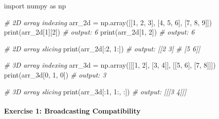 \documentclass[11pt]{article}
\newenvironment{Shaded}{}{}
\newcommand{\DecValTok}[1]{\textcolor[rgb]{0.25,0.63,0.44}{{#1}}}
\newcommand{\CommentTok}[1]{\textcolor[rgb]{0.38,0.63,0.69}{\textit{{#1}}}}
\newcommand{\NormalTok}[1]{{#1}}
\newcommand{\ImportTok}[1]{{#1}}
\newcommand{\OperatorTok}[1]{\textcolor[rgb]{0.40,0.40,0.40}{{#1}}}
\newcommand{\BuiltInTok}[1]{{#1}}
\begin{document}
\begin{Shaded}
\begin{Highlighting}[]
\ImportTok{import}\NormalTok{ numpy }\ImportTok{as}\NormalTok{ np}

\CommentTok{\# 2D array indexing}
\NormalTok{arr\_2d }\OperatorTok{=}\NormalTok{ np.array([[}\DecValTok{1}\NormalTok{, }\DecValTok{2}\NormalTok{, }\DecValTok{3}\NormalTok{], [}\DecValTok{4}\NormalTok{, }\DecValTok{5}\NormalTok{, }\DecValTok{6}\NormalTok{], [}\DecValTok{7}\NormalTok{, }\DecValTok{8}\NormalTok{, }\DecValTok{9}\NormalTok{]])}
\BuiltInTok{print}\NormalTok{(arr\_2d[}\DecValTok{1}\NormalTok{][}\DecValTok{2}\NormalTok{]) }\CommentTok{\# output: 6}
\BuiltInTok{print}\NormalTok{(arr\_2d[}\DecValTok{1}\NormalTok{, }\DecValTok{2}\NormalTok{]) }\CommentTok{\# output: 6}

\CommentTok{\# 2D array slicing}
\BuiltInTok{print}\NormalTok{(arr\_2d[:}\DecValTok{2}\NormalTok{, }\DecValTok{1}\NormalTok{:]) }\CommentTok{\# output: [[2 3]}
                      \CommentTok{\#          [5 6]]}
                      
\CommentTok{\# 3D array indexing}
\NormalTok{arr\_3d }\OperatorTok{=}\NormalTok{ np.array([[[}\DecValTok{1}\NormalTok{, }\DecValTok{2}\NormalTok{], [}\DecValTok{3}\NormalTok{, }\DecValTok{4}\NormalTok{]], [[}\DecValTok{5}\NormalTok{, }\DecValTok{6}\NormalTok{], [}\DecValTok{7}\NormalTok{, }\DecValTok{8}\NormalTok{]]])}
\BuiltInTok{print}\NormalTok{(arr\_3d[}\DecValTok{0}\NormalTok{, }\DecValTok{1}\NormalTok{, }\DecValTok{0}\NormalTok{]) }\CommentTok{\# output: 3}

\CommentTok{\# 3D array slicing}
\BuiltInTok{print}\NormalTok{(arr\_3d[:}\DecValTok{1}\NormalTok{, }\DecValTok{1}\NormalTok{:, :]) }\CommentTok{\# output: [[[3 4]]]}
\end{Highlighting}
\end{Shaded}

\hypertarget{exercise-1-broadcasting-compatibility}{%
\paragraph{Exercise 1: Broadcasting
Compatibility}\label{exercise-1-broadcasting-compatibility}}
\end{document}
